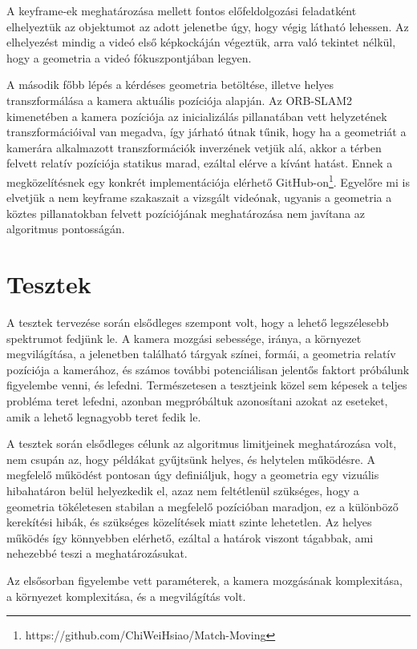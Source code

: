 A keyframe-ek meghatározása mellett fontos előfeldolgozási feladatként elhelyeztük az objektumot az adott jelenetbe úgy, hogy végig látható lehessen.
Az elhelyezést mindig a videó első képkockáján végeztük, arra való tekintet nélkül, hogy a geometria a videó fókuszpontjában legyen.

A második főbb lépés a kérdéses geometria betöltése, illetve helyes transzformálása a kamera aktuális pozíciója alapján.
Az ORB-SLAM2 kimenetében a kamera pozíciója az inicializálás pillanatában vett helyzetének transzformációival van megadva, így járható útnak tűnik, hogy ha a geometriát a kamerára alkalmazott transzformációk inverzének vetjük alá, akkor a térben felvett relatív pozíciója statikus marad, ezáltal elérve a kívánt hatást.
Ennek a megközelítésnek egy konkrét implementációja elérhető GitHub-on\footnote{https://github.com/ChiWeiHsiao/Match-Moving}.
Egyelőre mi is elvetjük a nem keyframe szakaszait a vizsgált videónak, ugyanis a geometria a köztes pillanatokban felvett pozíciójának meghatározása nem javítana az algoritmus pontosságán.


\section{Tesztek}

A tesztek tervezése során elsődleges szempont volt, hogy a lehető legszélesebb spektrumot fedjünk le.
A kamera mozgási sebessége, iránya, a környezet megvilágítása, a jelenetben található tárgyak színei, formái, a geometria relatív pozíciója a kamerához, és számos további potenciálisan jelentős faktort próbálunk figyelembe venni, és lefedni.
Természetesen a tesztjeink közel sem képesek a teljes probléma teret lefedni, azonban megpróbáltuk azonosítani azokat az eseteket, amik a lehető legnagyobb teret fedik le.

A tesztek során elsődleges célunk az algoritmus limitjeinek meghatározása volt, nem csupán az, hogy példákat gyűjtsünk helyes, és helytelen működésre.
A megfelelő működést pontosan úgy definiáljuk, hogy a geometria egy vizuális hibahatáron belül helyezkedik el, azaz nem feltétlenül szükséges, hogy a geometria tökéletesen stabilan a megfelelő pozícióban maradjon, ez a különböző kerekítési hibák, és szükséges közelítések miatt szinte lehetetlen.
Az helyes működés így könnyebben elérhető, ezáltal a határok viszont tágabbak, ami nehezebbé teszi a meghatározásukat.

Az elsősorban figyelembe vett paraméterek, a kamera mozgásának komplexitása, a környezet komplexitása, és a megvilágítás volt.

